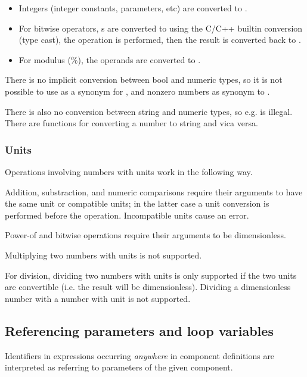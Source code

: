 \begin{itemize}
  \item Integers (integer constants,  parameters, etc) are
        converted to .
  \item For bitwise operators, s are converted to 
        using the C/C++ builtin conversion (type cast), the operation is performed,
        then the result is converted back to .
  \item For modulus (\%), the operands are converted to .
\end{itemize}

There is no implicit conversion between bool and numeric types, so it is
not possible to use  as a synonym for , and nonzero numbers
as synonym to .

There is also no conversion between string and numeric types, so e.g. 
is illegal. There are functions for converting a number to string and vica versa.

\subsubsection{Units}

Operations involving numbers with units work in the following way.

Addition, substraction, and numeric comparisons require their arguments to
have the same unit or compatible units; in the latter case a unit conversion
is performed before the operation. Incompatible units cause an error.

Power-of and bitwise operations require their arguments to be dimensionless.

Multiplying two numbers with units is not supported.

For division, dividing two numbers with units is only supported if the two
units are convertible (i.e. the result will be dimensionless). Dividing
a dimensionless number with a number with unit is not supported.


\subsection{Referencing parameters and loop variables}

Identifiers in expressions occurring \textit{anywhere} in component definitions
are interpreted as referring to parameters of the given component.

